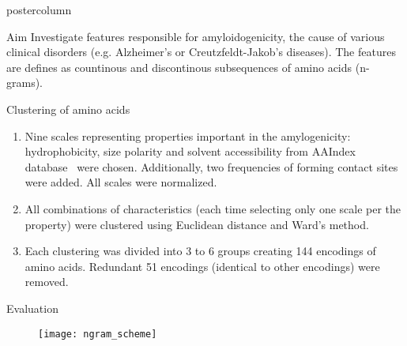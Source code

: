 \documentclass[final]{beamer}\usepackage[]{graphicx}\usepackage[]{color}
\makeatletter
\def\maxwidth{ %
  \ifdim\Gin@nat@width>\linewidth
    \linewidth
  \else
    \Gin@nat@width
  \fi
}
\newlength{\columnheight}
\makeatother
\begin{document}
\begin{frame}
\begin{columns}
\begin{column}{.485\textwidth}
\begin{beamercolorbox}[center,wd=\textwidth]{postercolumn}
\begin{minipage}[T]{.95\textwidth}
\parbox[t][\columnheight]{\textwidth}
{
\begin{block}{Aim}
Investigate features responsible for amyloidogenicity, the cause of various clinical disorders (e.g. Alzheimer's or Creutzfeldt-Jakob's diseases). The features are defines as countinous and discontinous subsequences of amino acids (n-grams).
\end{block}
\vfill


\begin{block}{Clustering of amino acids}

\begin{enumerate}[1.]
\item Nine scales representing properties important in the amylogenicity: hydrophobicity, size polarity and solvent accessibility from AAIndex database~\citep{kawashima_aaindex:_2008} were chosen. Additionally, two frequencies of forming contact sites~\citep{wozniak_characteristics_2014} were added. All scales were normalized.
\item All combinations of characteristics (each time selecting only one scale per the property) were clustered using Euclidean distance and Ward's method.
\item Each clustering was divided into 3 to 6 groups creating 144 encodings of amino acids. Redundant 51 encodings (identical to other encodings) were removed.
\end{enumerate}

\end{block}
\vfill

\begin{block}{Evaluation}

\begin{figure}
\texttt{[image: ngram\_scheme]}
\end{figure}


\end{block}}
\end{minipage}
\end{beamercolorbox}
\end{column}
\end{columns}
\end{frame}
\end{document}
